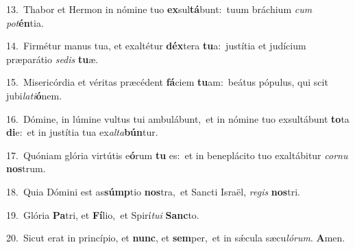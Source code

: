 {\numbfont\textcolor{\numbcolor}{13.}}~Thabor et Hermon in nómine tuo \textbf{ex}\-sul\-\textbf{tá}\-bunt:~\star tuum bráchium \textit{cum} \textit{pot}\-\textbf{én}tia.\par
{\numbfont\textcolor{\numbcolor}{14.}}~Firmétur manus tua, et exaltétur \textbf{déx}\-tera \textbf{tu}\-a:~\star justítia et judícium præparátio \textit{se}\-\textit{dis} \textbf{tu}\-æ.\par
{\numbfont\textcolor{\numbcolor}{15.}}~Misericórdia et véritas præcédent \textbf{fá}\-ciem \textbf{tu}\-am:~\star beátus pópulus, qui scit jubi\-\textit{la}\-\textit{ti}\textbf{ó}nem.\par
{\numbfont\textcolor{\numbcolor}{16.}}~Dómine, in lúmine vultus tui ambulábunt,~\dagger et in nómine tuo exsultábunt \textbf{to}\-ta \textbf{di}\-e:~\star et in justítia tua ex\-\textit{al}\-\textit{ta}\textbf{bún}tur.\par
{\numbfont\textcolor{\numbcolor}{17.}}~Quóniam glória virtútis e\-\textbf{ó}\-rum \textbf{tu} es:~\star et in beneplácito tuo exaltábitur \textit{cor}\-\textit{nu} \textbf{nos}\-trum.\par
{\numbfont\textcolor{\numbcolor}{18.}}~Quia Dómini est as\-\textbf{súmp}\-tio \textbf{nos}\-tra,~\star et Sancti Israël, \textit{re}\-\textit{gis} \textbf{nos}\-tri.\par
{\numbfont\textcolor{\numbcolor}{19.}}~Glória \textbf{Pa}\-tri, et \textbf{Fí}\-lio,~\star et Spirí\-\textit{tu}\-\textit{i} \textbf{Sanc}\-to.\par
{\numbfont\textcolor{\numbcolor}{20.}}~Sicut erat in princípio, et \textbf{nunc}\-, et \textbf{sem}\-per,~\star et in sǽcula sæcu\-\textit{ló}\-\textit{rum}. \textbf{A}\-men.\par
